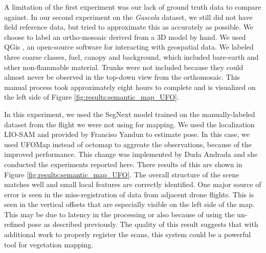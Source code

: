 A limitation of the first experiment was our lack of ground truth data to compare against.
In our second experiment on the \textit{Gascola} dataset, we still did not have field reference data, but tried to approximate this as accurately as possible.
We choose to label an ortho-mosoaic derived from a 3D model by hand. We used QGis \cite{QGIS_software}, an open-source software for interacting with geospatial data. We labeled three coarse classes, fuel, canopy and background, which included bare-earth and other non-flammable material. Trunks were not included because they could almost never be observed in the top-down view from the orthomosaic. This manual process took approximately eight hours to complete and is visualized on the left side of Figure \ref{fig:results:semantic_map_UFO}.

In this experiment, we used the SegNext model trained on the manually-labeled dataset from the flight we were not using for mapping. We used the localization LIO-SAM \cite{} and provided by Franciso Yandun to estimate pose. In this case, we used UFOMap instead of octomap to aggreate the observations, because of the improved performance. This change was implemented by Duda Andrada and she conducted the experiments reported here. There results of this are shown in Figure \ref{fig:results:semantic_map_UFO}. The overall structure of the scene matches well and small local features are correctly identified. One major source of error is seen in the miss-registration of data from adjacent drone flights. This is seen in the vertical offsets that are especially visible on the left side of the map. This may be due to latency in the processing or also because of using the un-refined pose as described previously. The quality of this result suggests that with additional work to properly register the scans, this system could be a powerful tool for vegetation mapping. 

